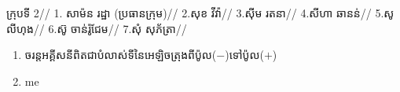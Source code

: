 \documentclass[15pt,a4paper]{article}
\author{james1}
\date{\today}
\newenvironment{kfont}{\khfont}{\par}
\begin{document}
\begin{flushright}

ក្រុបទី 2//
1. សាម៉ន រដ្ឋា (ប្រធានក្រុម)//
2.សុខ វីវ៉ា//
3.សុីម រតនា//
4.សីហា ឆានន់//
5.សូ លីហុង//
6.ស៊ូ ចាន់រ៉ូជែម//
7.សុំ សុភ័ត្រា//

\end{flushright}
\begin{enumerate}
\item 
\begin{kfont}
ចរន្តអគ្គីសនីពិតជាបំលាស់ទីនៃអេឡិចត្រុងពីប៉ូល(\(-\))ទៅប៉ូល(\(+\))
\end{kfont}
\item 
me
\end{enumerate}
\end{document}
